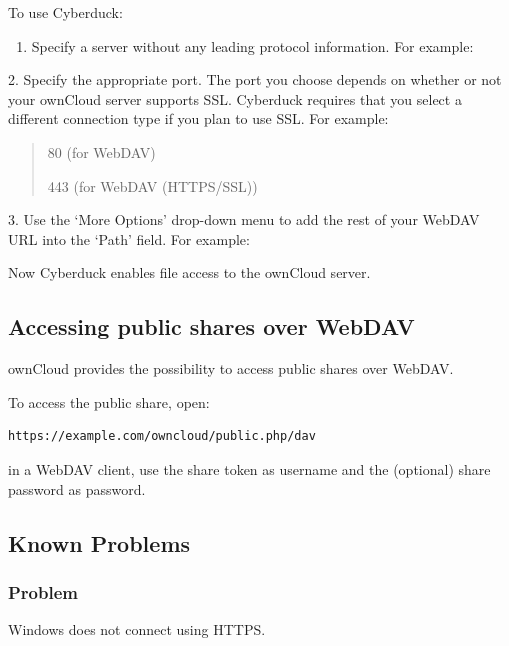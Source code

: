\documentclass[letterpaper,10pt,english]{sphinxmanual}
\begin{document}
To use Cyberduck:
\begin{enumerate}
\item {} 
Specify a server without any leading protocol information. For example:

\end{enumerate}
\begin{quote}

\end{quote}

2. Specify the appropriate port.  The port you choose depends on whether or not
your ownCloud server supports SSL. Cyberduck requires that you select a
different connection type if you plan to use SSL.  For example:
\begin{quote}

80 (for WebDAV)

443 (for WebDAV (HTTPS/SSL))
\end{quote}

3. Use the `More Options' drop-down menu to add the rest of your WebDAV URL into
the `Path' field. For example:
\begin{quote}

\end{quote}

Now Cyberduck enables file access to the ownCloud server.


\subsection{Accessing public shares over WebDAV}
\label{files/access_webdav:accessing-public-shares-over-webdav}
ownCloud provides the possibility to access public shares over WebDAV.

To access the public share, open:

\begin{Verbatim}[commandchars=\\\{\}]
https://example.com/owncloud/public.php/dav
\end{Verbatim}

in a WebDAV client, use the share token as username and the (optional) share password
as password.


\subsection{Known Problems}
\label{files/access_webdav:known-problems}

\subsubsection{Problem}
\label{files/access_webdav:id3}
Windows does not connect using HTTPS.
\end{document}

